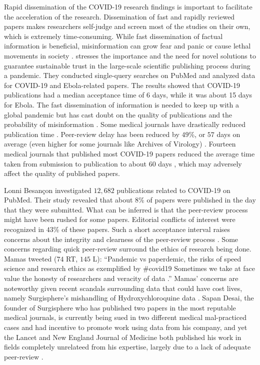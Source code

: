 \documentclass[acmsmall,authordraft]{acmart}
\begin{document}
Rapid dissemination of the COVID-19 research findings is important to facilitate the acceleration of the research. Dissemination of fast and rapidly reviewed papers makes researchers self-judge and screen most of the studies on their own, which is extremely time-consuming. While fast dissemination of factual information is beneficial, misinformation can grow fear and panic or cause lethal movements in society \citep{reuters2020speed}. \citet{palayew2020pandemic} stresses the importance and the need for novel solutions to guarantee sustainable trust in the large-scale scientific publishing process during a pandemic. They conducted single-query searches on PubMed and analyzed data for COVID-19 and Ebola-related papers. The results showed that COVID-19 publications had a median acceptance time of 6 days, while it was about 15 days for Ebola. The fast dissemination of information is needed to keep up with a global pandemic but has cast doubt on the quality of publications and the probability of misinformation \citep{palayew2020pandemic}. Some medical journals have drastically reduced publication time \citep{horbach2020pandemic, Kupferschmidt2020culture}. Peer-review delay has been reduced by $49$\%, or $57$ days on average (even higher for some journals like Archives of Virology) \citep{horbach2020pandemic}. Fourteen medical journals that published most COVID-19 papers reduced the average time taken from submission to publication to about $60$ days \citep{Brainard2020drowning}, which may adversely affect the quality of published papers.

Lonni Besançon investigated $12,682$ publications related to COVID-19 on PubMed. Their study revealed that about $8$\% of papers were published in the day that they were submitted. What can be inferred is that the peer-review process might have been rushed for some papers. Editorial conflicts of interest were recognized in $43$\% of these papers. Such a short acceptance interval raises concerns about the integrity and clearness of the peer-review process \citep{besanccon2020open}. Some concerns regarding quick peer-review surround the ethics of research being done. Mamas tweeted ($74$ RT, $145$ L): ``Pandemic vs paperdemic, the risks of speed science and research ethics as exemplified by \#covid19 Sometimes we take at face value the honesty of researchers and veracity of data \citep{Mamas2020twitter}.'' Mamas' concerns are noteworthy given recent scandals surrounding data that could have cost lives, namely Surgisphere's mishandling of Hydroxychloroquine data \citep{servick2020pandemic}. Sapan Desai, the founder of Surgisphere who has published two papers in the most reputable medical journals, is currently being sued in two different medical mal-practiced cases and had incentive to promote work using data from his company, and yet the Lancet and New England Journal of Medicine both published his work in fields completely unrelateed from his expertise, largely due to a lack of adequate peer-review \citep{piller2020s}.
\end{document}
